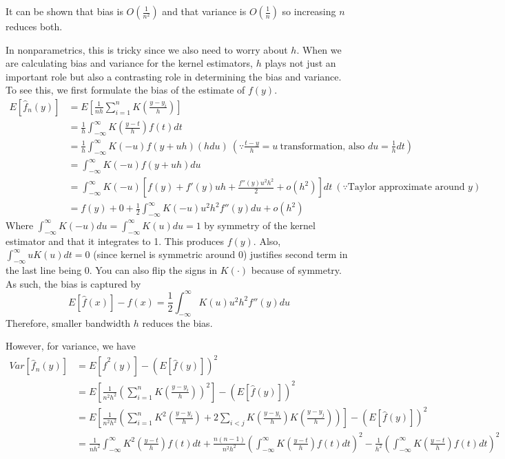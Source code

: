 \documentclass[12pt]{article}
\theoremstyle{definition}
\theoremstyle{property}
\theoremstyle{assumption}
\theoremstyle{example}
\theoremstyle{comment}
\begin{document}
It can be shown that bias is $O\left(\frac{1}{n^2}\right)$ and that variance is $O\left(\frac{1}{n}\right)$ so increasing $n$ reduces both. 
\par
In nonparametrics, this is tricky since we also need to worry about $h$. When we are calculating bias and variance for the kernel estimators, $h$ plays not just an important role but also a contrasting role in determining the bias and variance. 
To see this, we first formulate the bias of the estimate of $f(y)$.
\footnotesize{\begin{align*}
E[\hat{f}_n(y)]&=E\left[\frac{1}{nh}\sum_{i=1}^n K\left(\frac{y-y_i}{h}\right)\right]\\
&=\frac{1}{h}\int_{-\infty}^\infty K\left(\frac{y-t}{h}\right)f(t)dt\\
&=\frac{1}{h}\int_{-\infty}^\infty K(-u)f(y+uh)(hdu) \ \left(\because \frac{t-y}{h}=u \ \text{transformation, also } du=\frac{1}{h}dt\right)\\
&=\int_{-\infty}^\infty K(-u)f(y+uh)du\\
&=\int_{-\infty}^\infty K(-u)\left[f(y)+f'(y)uh + \frac{f''(y)u^2h^2}{2}+o(h^2)\right]dt \ (\because \text{Taylor approximate around $y$}) \\
&=f(y)+0+\frac{1}{2}\int_{-\infty}^\infty K(-u)u^2h^2f''(y)du + o(h^2)
\end{align*}}\normalsize
Where $\int_{-\infty}^\infty K(-u)du=\int_{-\infty}^\infty K(u)du=1$ by symmetry of the kernel estimator and that it integrates to 1. This  produces $f(y)$. Also, $\int_{-\infty}^\infty uK(u)dt=0$ (since kernel is symmetric around 0) justifies second term in the last line being 0. You can also flip the signs in $K(\cdot)$ because of symmetry. As such, the bias is captured by 
\[
E[\hat{f}(x)]-f(x)=\frac{1}{2}\int_{-\infty}^\infty K(u)u^2h^2f''(y)du
\]
Therefore, smaller bandwidth $h$ reduces the bias.\par
However, for variance, we have
 \footnotesize{\begin{align*}
Var[\hat{f}_n(y)]&=E[\hat{f}^2(y)]-(E[\hat{f}(y)])^2\\ 
&=E\left[\frac{1}{n^2h^2}\left(\sum_{i=1}^nK\left(\frac{y-y_i}{h}\right)\right)^2\right]-(E[\hat{f}(y)])^2\\
&=E\left[\frac{1}{n^2h^2}\left(\sum_{i=1}^nK^2\left(\frac{y-y_i}{h}\right)+2\sum_{i<j} K\left(\frac{y-y_i}{h}\right)K\left(\frac{y-y_j}{h}\right)\right)\right]-(E[\hat{f}(y)])^2\\
&=\frac{1}{nh^2}\int_{-\infty}^\infty K^2\left(\frac{y-t}{h}\right)f(t)dt+\frac{n(n-1)}{n^2h^2}\left(\int_{-\infty}^\infty K\left(\frac{y-t}{h}\right)f(t)dt\right)^2-\frac{1}{h^2}\left(\int_{-\infty}^\infty K\left(\frac{y-t}{h}\right)f(t)dt\right)^2
 \end{align*}}\normalsize
\end{document}
